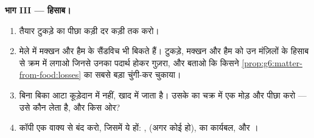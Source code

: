 \begin{problem}[{सप्ताहांत समस्या --- रोटी का एक बैच, बीज से टुकड़े तक
पीछा किया हुआ}]
\medskip\noindent\textbf{भाग III --- हिसाब।}
\begin{enumerate}[resume]
  \item तैयार टुकड़े का पीछा कड़ी दर कड़ी  तक करो।
  \item मेले में मक्खन और हैम के सैंडविच भी बिकते हैं। टुकड़े, मक्खन
        और हैम को उन मंज़िलों के हिसाब से क्रम में लगाओ जिनसे उनका
        पदार्थ होकर गुज़रा, और बताओ कि किसने
        \cref{prop:g6:matter-from-food:losses} का सबसे बड़ा चुंगी-कर
        चुकाया।
  \item बिना बिका आटा कूड़ेदान में नहीं, खाद में जाता है। उसके  का चक्र में एक मोड़ और पीछा करो --- उसे कौन लेता है, और
        किस ओर?
  \item कॉपी एक वाक्य से बंद करो, जिसमें ये हों: , 
        (अगर कोई हो),  का कार्यबल, और ।
\end{enumerate}
\end{problem}
